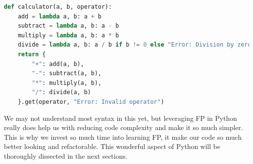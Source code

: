 \documentclass[twoside,final]{hcmut-report}
\begin{document}
\begin{lstlisting}[language=Python, caption=Composite Calculator Implementation]
def calculator(a, b, operator):
    add = lambda a, b: a + b
    subtract = lambda a, b: a - b
    multiply = lambda a, b: a * b
    divide = lambda a, b: a / b if b != 0 else "Error: Division by zero"
    return {
        "+": add(a, b),
        "-": subtract(a, b),
        "*": multiply(a, b),
        "/": divide(a, b)
    }.get(operator, "Error: Invalid operator")
    \end{lstlisting}
\hspace*{6.5mm} We may not understand most syntax in this yet, but leveraging FP in Python really does help us with reducing code complexity and make it so much simpler. This is why we invest so much time into learning FP, it make our code so much better looking and refactorable. This wonderful aspect of Python will be thoroughly dissected in the next sections.
\end{document}
